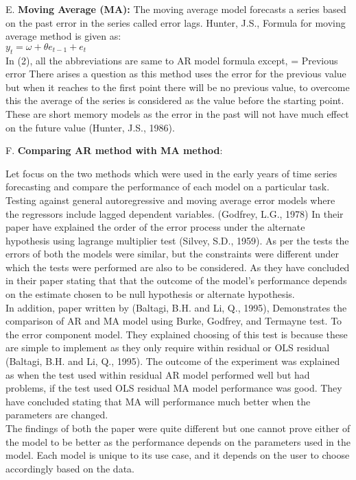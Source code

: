 \documentclass[10pt]{report}
\begin{document}
\begin{flushleft}
		
		E.	\textbf{Moving Average (MA):}
		The moving average model forecasts a series based on the past error in the series called error lags. Hunter, J.S., Formula for moving average method is given as:\\
		$ y_{t} = \omega + \theta e _{t-1}+ e_{t}$
		\\
		In (2), all the abbreviations are same to AR model formula except,   = Previous error
		There arises a question as this method uses the error for the previous value but when it reaches to the first point there will be no previous value, to overcome this the average of the series is considered as the value before the starting point. These are short memory models as the error in the past will not have much effect on the future value (Hunter, J.S., 1986).
		
		F.	\textbf{Comparing AR method with MA method}:
		
		Let focus on the two methods which were used in the early years of time series forecasting and compare the performance of each model on a particular task. Testing against general autoregressive and moving average error models where the regressors include lagged dependent variables. (Godfrey, L.G., 1978) In their paper have explained the order of the error process under the alternate hypothesis using lagrange multiplier test (Silvey, S.D., 1959). As per the tests the errors of both the models were similar, but the constraints were  different under which the tests were performed are also to be considered. As they have concluded in their paper stating that that the outcome of the model’s performance depends on the estimate chosen to be null hypothesis or alternate hypothesis.\\
		
		In addition, paper written by (Baltagi, B.H. and Li, Q., 1995), Demonstrates the comparison of AR and MA model using Burke, Godfrey, and Termayne test. To the error component model. They explained choosing of this test is because these are simple to implement as they only require within residual or OLS residual (Baltagi, B.H. and Li, Q., 1995). The outcome of the experiment was explained as when the test used within residual AR model performed well but had problems, if the test used OLS residual MA model performance was good. They have concluded stating that MA will performance much better when the parameters are changed.\\
		
		The findings of both the paper were quite different but one cannot prove either of the model to be better as the performance depends on the parameters used in the model. Each model is unique to its use case, and it depends on the user to choose accordingly based on the data.\\
		

\end{flushleft}
\end{document}

